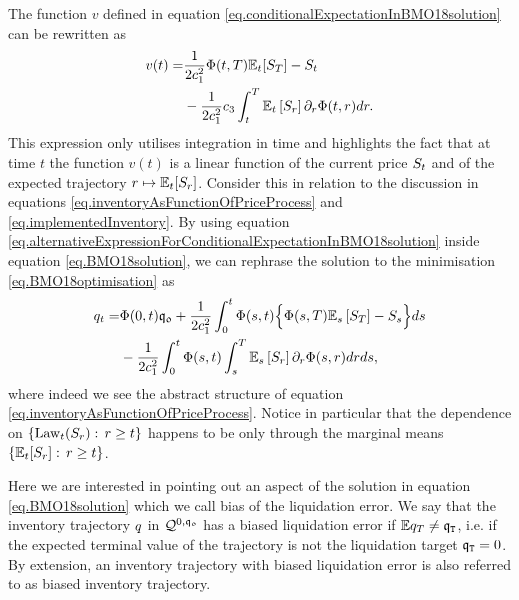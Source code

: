 \documentclass[10pt,a4paper]{article}
\begin{document}
	The function $v$ defined in equation \eqref{eq.conditionalExpectationInBMO18solution} can be rewritten as 
	\begin{equation}\label{eq.alternativeExpressionForConditionalExpectationInBMO18solution}
	\begin{split}
	v(t) = &\frac{1}{2c_{1}^{2}} \Phi(t,T) \mathbb{{E}}_t [S_T] - S_t \\
	& - \frac{1}{2c_{1}^{2}}c_{3} \int_{t}^{T} \mathbb{{E}}_t\left[ S_r\right] \partial_r \Phi(t,r)dr.
	\end{split}
	\end{equation}
	This expression only utilises integration in time and highlights the fact that at time $t$ the function $v(t)$ is a linear function of the current price $S_{t}$ and of the expected trajectory $r \mapsto \mathbb{{E}}_t [S_r]$. Consider this in relation to the discussion in equations \eqref{eq.inventoryAsFunctionOfPriceProcess} and \eqref{eq.implementedInventory}. By using equation \eqref{eq.alternativeExpressionForConditionalExpectationInBMO18solution} inside equation \eqref{eq.BMO18solution}, we can rephrase the solution to the minimisation \eqref{eq.BMO18optimisation} as 
	\begin{equation}\label{eq.BMO18inventoryAsFunctionOfMarginals}
	\begin{split}
	q_t =& \Phi(0,t)\mathfrak{q_0} + \frac{1}{2c_{1}^{2}} \int_{0}^{t} \Phi(s,t)
	 \Big\lbrace
	 \Phi(s,T) \mathbb{{E}}_s \left[S_T\right] - S_s
	  \Big\rbrace ds \\
	  & - 
	  \frac{1}{2c_{1}^{2}} \int_{0}^{t} \Phi(s,t)
	  \int_{s}^{T} \mathbb{{E}}_s\left[ S_r\right] \partial_r \Phi(s,r)dr ds,
	  \end{split}
	\end{equation}
	where indeed we see the abstract structure of equation \eqref{eq.inventoryAsFunctionOfPriceProcess}. Notice in particular that the dependence on $\lbrace \text{Law}_t (S_r): \, r \geq t\rbrace $ happens to be only through the marginal means $\lbrace \mathbb{{E}}_t [S_r]: \, r \geq t\rbrace $. 
	
	
	Here we are interested in pointing out an aspect of the solution in equation \eqref{eq.BMO18solution} which we call bias of the liquidation error. We say that the inventory trajectory $q$ in $\mathcal{Q}^{0,\mathfrak{q_0}}$ has a biased liquidation error if $\mathbb{{E}} q_T \neq \mathfrak{q}_{\mathtt{T} }$, i.e. if the expected terminal value of the trajectory is not the liquidation target $\mathfrak{q}_{\mathtt{T} } = 0$. By extension, an inventory trajectory with biased liquidation error is also referred to as biased inventory trajectory. 
	
\end{document}
